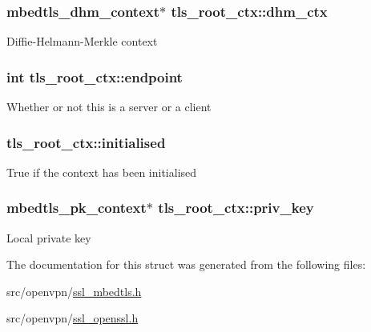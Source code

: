 \subsubsection[{dhm\+\_\+ctx}]{\setlength{\rightskip}{0pt plus 5cm}mbedtls\+\_\+dhm\+\_\+context$\ast$ tls\+\_\+root\+\_\+ctx\+::dhm\+\_\+ctx}\label{structtls__root__ctx_a9aaf4284e2fa54b38e57070057a28a2e}
Diffie-\/\+Helmann-\/\+Merkle context \hypertarget{structtls__root__ctx_ac8ae8de8fc8e6b1aa1d2791480d8da12}{}
\subsubsection[{endpoint}]{\setlength{\rightskip}{0pt plus 5cm}int tls\+\_\+root\+\_\+ctx\+::endpoint}\label{structtls__root__ctx_ac8ae8de8fc8e6b1aa1d2791480d8da12}
Whether or not this is a server or a client \hypertarget{structtls__root__ctx_ab71180f4ac83a6a4d5200d193897a0d7}{}
\subsubsection[{initialised}]{ tls\+\_\+root\+\_\+ctx\+::initialised}\label{structtls__root__ctx_ab71180f4ac83a6a4d5200d193897a0d7}
True if the context has been initialised \hypertarget{structtls__root__ctx_af1c33dcb72f792e9aace760b9d10879b}{}
\subsubsection[{priv\+\_\+key}]{\setlength{\rightskip}{0pt plus 5cm}mbedtls\+\_\+pk\+\_\+context$\ast$ tls\+\_\+root\+\_\+ctx\+::priv\+\_\+key}\label{structtls__root__ctx_af1c33dcb72f792e9aace760b9d10879b}
Local private key 

The documentation for this struct was generated from the following files\+:\begin{DoxyCompactItemize}
\item 
src/openvpn/\hyperlink{ssl__mbedtls_8h}{ssl\+\_\+mbedtls.\+h}\item 
src/openvpn/\hyperlink{ssl__openssl_8h}{ssl\+\_\+openssl.\+h}\end{DoxyCompactItemize}

